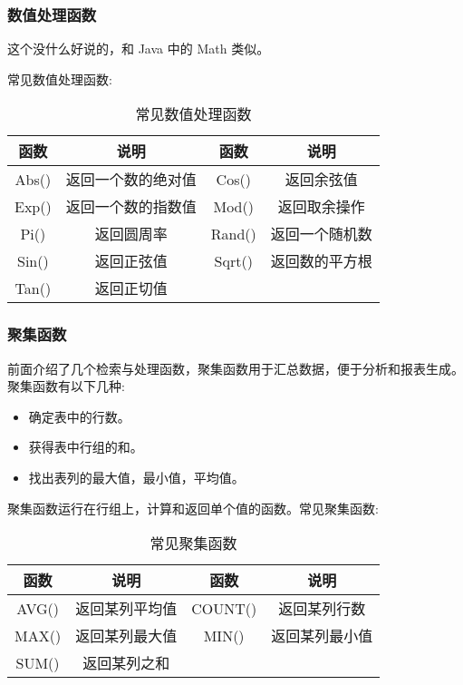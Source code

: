 \subsubsection{数值处理函数}

这个没什么好说的，和 Java 中的 Math 类似。

常见数值处理函数:

\begin{table}[H]
    \centering
    \caption{常见数值处理函数}
    \label{table:常见数值处理函数}
    \setlength{\tabcolsep}{4mm}
    \begin{tabular}{cc|cc}
        \toprule
        \textbf{函数} & \textbf{说明} & \textbf{函数} & \textbf{说明} \\
        \midrule
        Abs() & 返回一个数的绝对值 & Cos() & 返回余弦值 \\
        Exp() & 返回一个数的指数值 & Mod() & 返回取余操作 \\
        Pi() & 返回圆周率 & Rand() & 返回一个随机数 \\
        Sin() & 返回正弦值 & Sqrt() & 返回数的平方根 \\
        Tan() & 返回正切值 \\
        \bottomrule
    \end{tabular}
\end{table}

\subsubsection{聚集函数}

前面介绍了几个检索与处理函数，聚集函数用于汇总数据，便于分析和报表生成。聚集函数有以下几种:

\begin{itemize}
    \item 确定表中的行数。
    \item 获得表中行组的和。
    \item 找出表列的最大值，最小值，平均值。
\end{itemize}

聚集函数运行在行组上，计算和返回单个值的函数。常见聚集函数:

\begin{table}[H]
    \centering
    \caption{常见聚集函数}
    \label{table:常见聚集函数}
    \setlength{\tabcolsep}{4mm}
    \begin{tabular}{cc|cc}
        \toprule
        \textbf{函数} & \textbf{说明} & \textbf{函数} & \textbf{说明} \\
        \midrule
        AVG() & 返回某列平均值 & COUNT() & 返回某列行数 \\
        MAX() & 返回某列最大值 & MIN() & 返回某列最小值 \\
        SUM() & 返回某列之和 \\
        \bottomrule
    \end{tabular}
\end{table}

